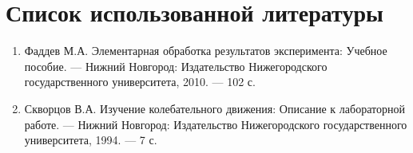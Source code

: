\section{Список использованной литературы}

\begin{enumerate}
	\item Фаддев М.А. Элементарная обработка результатов эксперимента: Учебное пособие. — Нижний Новгород: Издательство Нижегородского государственного университета, 2010. — 102 с.
	\item Скворцов В.А. Изучение колебательного движения: Описание к лабораторной работе. — Нижний Новгород: Издательство Нижегородского государственного университета, 1994. — 7 с.
\end{enumerate}
